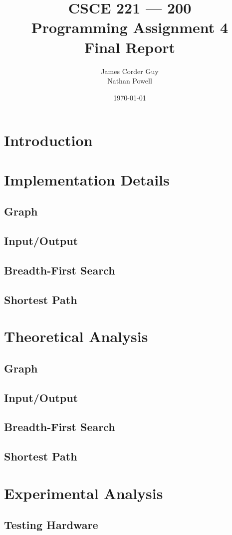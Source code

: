 \documentclass[titlepage]{article}
\title{
	\textbf{
		CSCE 221 --- 200 \\
		Programming Assignment 4 \\
		Final Report
	}
}
\author{
	James Corder Guy \\
	Nathan Powell
}
\date{
	\today
}
\begin{document}
	\maketitle
	\begin{multicols}{2}
		\section{Introduction}
		\section{Implementation Details}
			\subsection{Graph}
			\subsection{Input/Output}
			\subsection{Breadth-First Search}
			\subsection{Shortest Path}

		\section{Theoretical Analysis}
			\subsection{Graph}
			\subsection{Input/Output}
			\subsection{Breadth-First Search}
			\subsection{Shortest Path}

		\section{Experimental Analysis}
			\subsection{Testing Hardware}

\end{multicols}
\end{document}
